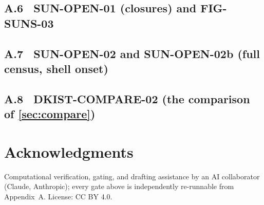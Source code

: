 \documentclass[11pt]{article}
\renewcommand{\S}{\mathhexbox278}
\theoremstyle{definition}
\theoremstyle{remark}
\begin{document}
\subsection*{A.6 \ SUN-OPEN-01 (closures) and FIG-SUNS-03}


\subsection*{A.7 \ SUN-OPEN-02 and SUN-OPEN-02b (full census, shell onset)}


\subsection*{A.8 \ DKIST-COMPARE-02 (the comparison of \S\ref{sec:compare})}


\section*{Acknowledgments}
Computational verification, gating, and drafting assistance by an AI
collaborator (Claude, Anthropic); every gate above is independently
re-runnable from Appendix~A. License: CC BY 4.0.
\end{document}
